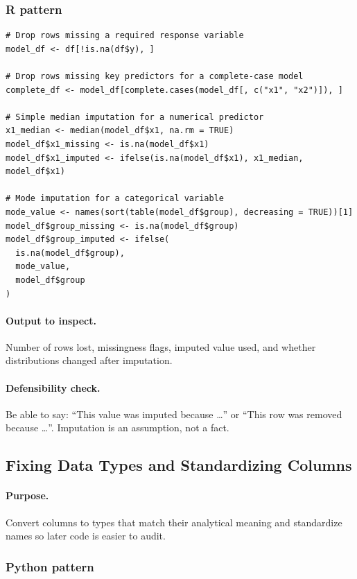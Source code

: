 \subsubsection*{R pattern}

\begin{verbatim}
# Drop rows missing a required response variable
model_df <- df[!is.na(df$y), ]

# Drop rows missing key predictors for a complete-case model
complete_df <- model_df[complete.cases(model_df[, c("x1", "x2")]), ]

# Simple median imputation for a numerical predictor
x1_median <- median(model_df$x1, na.rm = TRUE)
model_df$x1_missing <- is.na(model_df$x1)
model_df$x1_imputed <- ifelse(is.na(model_df$x1), x1_median, model_df$x1)

# Mode imputation for a categorical variable
mode_value <- names(sort(table(model_df$group), decreasing = TRUE))[1]
model_df$group_missing <- is.na(model_df$group)
model_df$group_imputed <- ifelse(
  is.na(model_df$group),
  mode_value,
  model_df$group
)
\end{verbatim}

\paragraph{Output to inspect.} Number of rows lost, missingness flags, imputed value used, and whether distributions changed after imputation.

\paragraph{Defensibility check.} Be able to say: ``This value was imputed because \ldots{}'' or ``This row was removed because \ldots{}''.  Imputation is an assumption, not a fact.

\subsection{Fixing Data Types and Standardizing Columns}
\label{app:ch03-software-cookbook-types-names}

\paragraph{Purpose.} Convert columns to types that match their analytical meaning and standardize names so later code is easier to audit.

\subsubsection*{Python pattern}

